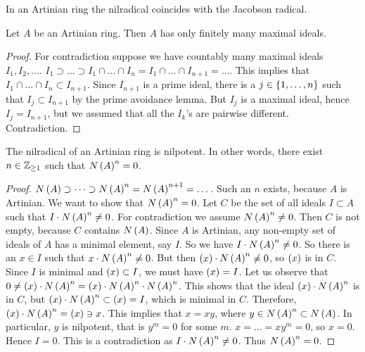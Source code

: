 \begin{corollary}
\label{cor:12.8}
In an Artinian ring the nilradical coincides with the Jacobson radical.
\end{corollary}

\begin{lemma}
\label{lem:12.9}
Let $ A $ be an Artinian ring. Then $ A $ has only finitely many maximal ideals.
\end{lemma}

\begin{proof}
For contradiction suppose we have countably many maximal ideals $ I_1, I_2, \dots $. $ I_1 \supset \dots \supset I_1 \cap \dots \cap I_n = I_1 \cap \dots \cap I_{n + 1} = \dots $. This implies that $ I_1 \cap \dots \cap I_n \subset I_{n + 1} $. Since $ I_{n + 1} $ is a prime ideal, there is a $ j \in \left\{ 1, \dots, n \right\} $ such that $ I_j \subset I_{n + 1} $ by the prime avoidance lemma. But $ I_j $ is a maximal ideal, hence $ I_j = I_{n + 1} $, but we assumed that all the $ I_k $'s are pairwise different. Contradiction.
\end{proof}

\begin{lemma}
\label{lem:12.10}
The nilradical of an Artinian ring is nilpotent. In other words, there exist $ n \in \mathbb{Z}_{\ge 1} $ such that $ N\left( A \right)^n = 0 $.
\end{lemma}

\begin{proof}
$ N\left( A \right) \supset \dots \supset N\left( A \right)^n = N\left( A \right)^{n + 1} = \dots $. Such an $ n $ exists, because $ A $ is Artinian. We want to show that $ N\left( A \right)^n = 0 $. Let $ C $ be the set of all ideals $ I \subset A $ such that $ I \cdot N\left( A \right)^n \ne 0 $. For contradiction we assume $ N\left( A \right)^n \ne 0 $. Then $ C $ is not empty, because $ C $ contains $ N\left( A \right) $. Since $ A $ is Artinian, any non-empty set of ideals of $ A $ has a minimal element, say $ I $. So we have $ I \cdot N\left( A \right)^n \ne 0 $. So there is an $ x \in I $ such that $ x \cdot N\left( A \right)^n \ne 0 $. But then $ \left( x \right) \cdot N\left( A \right)^n \ne 0 $, so $ \left( x \right) $ is in $ C $. Since $ I $ is minimal and $ \left( x \right) \subset I $, we must have $ \left( x \right) = I $. Let us observe that $ 0 \ne \left( x \right) \cdot N\left( A \right)^n = \left( x \right) \cdot N\left( A \right)^n \cdot N\left( A \right)^n $. This shows that the ideal $ \left( x \right) \cdot N\left( A \right)^n $ is in $ C $, but $ \left( x \right) \cdot N\left( A \right)^n \subset \left( x \right) = I $, which is minimal in $ C $. Therefore, $ \left( x \right) \cdot N\left( A \right)^n = \left( x \right) \ni x $. This implies that $ x = xy $, where $ y \in N\left( A \right)^n \subset N\left( A \right) $. In particular, $ y $ is nilpotent, that is $ y^m = 0 $ for some $ m $. $ x = \dots = xy^m = 0 $, so $ x = 0 $. Hence $ I = 0 $. This is a contradiction as $ I \cdot N\left( A \right)^n \ne 0 $. Thus $ N\left( A \right)^n = 0 $.
\end{proof}

